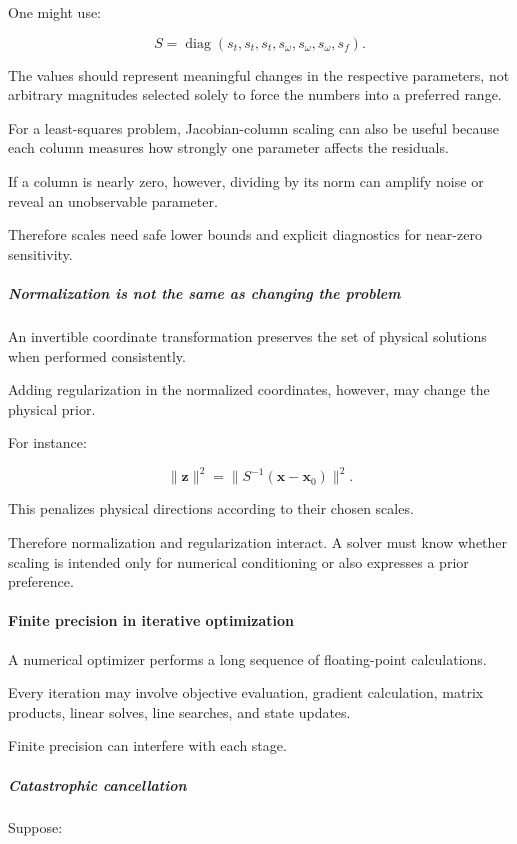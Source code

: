 One might use:

\[
S= \operatorname{diag} (s_t,s_t,s_t,s_\omega,s_\omega,s_\omega,s_f).
\]

The values should represent meaningful changes in the respective parameters, not arbitrary magnitudes selected solely to force the numbers into a preferred range.

For a least-squares problem, Jacobian-column scaling can also be useful because each column measures how strongly one parameter affects the residuals.

If a column is nearly zero, however, dividing by its norm can amplify noise or reveal an unobservable parameter.

Therefore scales need safe lower bounds and explicit diagnostics for near-zero sensitivity.

\subparagraph{Normalization is not the same as changing the problem}\label{normalization-is-not-the-same-as-changing-the-problem}

An invertible coordinate transformation preserves the set of physical solutions when performed consistently.

Adding regularization in the normalized coordinates, however, may change the physical prior.

For instance:

\[
\|\mathbf z\|^2 = \|S^{-1}(\mathbf x-\mathbf x_0)\|^2.
\]

This penalizes physical directions according to their chosen scales.

Therefore normalization and regularization interact. A solver must know whether scaling is intended only for numerical conditioning or also expresses a prior preference.

\paragraph{Finite precision in iterative optimization}\label{finite-precision-in-iterative-optimization}

A numerical optimizer performs a long sequence of floating-point calculations.

Every iteration may involve objective evaluation, gradient calculation, matrix products, linear solves, line searches, and state updates.

Finite precision can interfere with each stage.

\subparagraph{Catastrophic cancellation}\label{catastrophic-cancellation}

Suppose:

